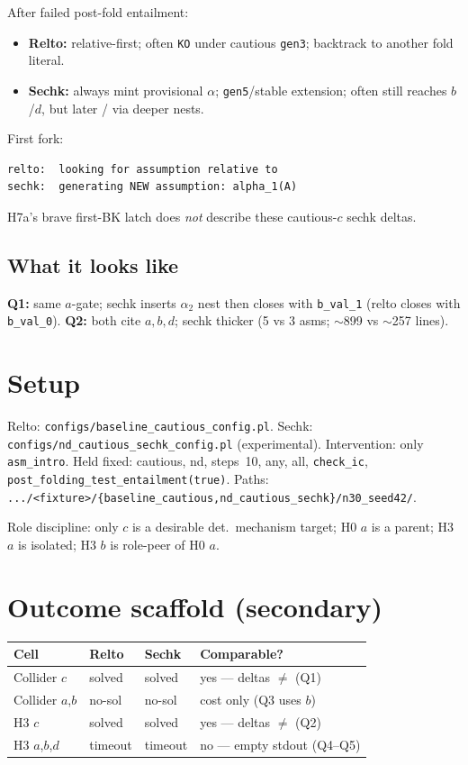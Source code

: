 \documentclass[11pt]{article}
\begin{document}
After failed post-fold entailment:
\begin{itemize}
  \item \textbf{Relto:} relative-first; often \texttt{KO} under cautious
    \texttt{gen3}; backtrack to another fold literal.
  \item \textbf{Sechk:} always mint provisional $\alpha$; \texttt{gen5}/stable
    extension; often still reaches $b$/$d$, but later / via deeper nests.
\end{itemize}
First fork:
\begin{verbatim}
relto:  looking for assumption relative to
sechk:  generating NEW assumption: alpha_1(A)
\end{verbatim}
H7a's brave first-BK latch does \emph{not} describe these cautious-$c$ sechk
deltas.

\subsection{What it looks like}

\textbf{Q1:} same $a$-gate; sechk inserts $\alpha_2$ nest then closes with
\texttt{b\_val\_1} (relto closes with \texttt{b\_val\_0}).
\textbf{Q2:} both cite $a,b,d$; sechk thicker (5 vs 3 asms; $\sim$899 vs
$\sim$257 lines).

\section{Setup}

Relto: \texttt{configs/baseline\_cautious\_config.pl}.
Sechk: \texttt{configs/nd\_cautious\_sechk\_config.pl} (experimental).
Intervention: only \texttt{asm\_intro}.
Held fixed: cautious, nd, steps~10, any, all, \texttt{check\_ic},
\texttt{post\_folding\_test\_entailment(true)}.
Paths:
\texttt{.../<fixture>/\{baseline\_cautious,nd\_cautious\_sechk\}/n30\_seed42/}.

Role discipline: only $c$ is a desirable det.\ mechanism target; H0 $a$ is a
parent; H3 $a$ is isolated; H3 $b$ is role-peer of H0 $a$.

\section{Outcome scaffold (secondary)}

{\footnotesize
\begin{center}
\begin{tabular}{@{}llll@{}}
\toprule
Cell & Relto & Sechk & Comparable? \\
\midrule
Collider $c$ & solved & solved & yes --- deltas $\neq$ (Q1) \\
Collider $a$,$b$ & no-sol & no-sol & cost only (Q3 uses $b$) \\
H3 $c$ & solved & solved & yes --- deltas $\neq$ (Q2) \\
H3 $a$,$b$,$d$ & timeout & timeout & no --- empty stdout (Q4--Q5) \\
\bottomrule
\end{tabular}
\end{center}
}
\end{document}
